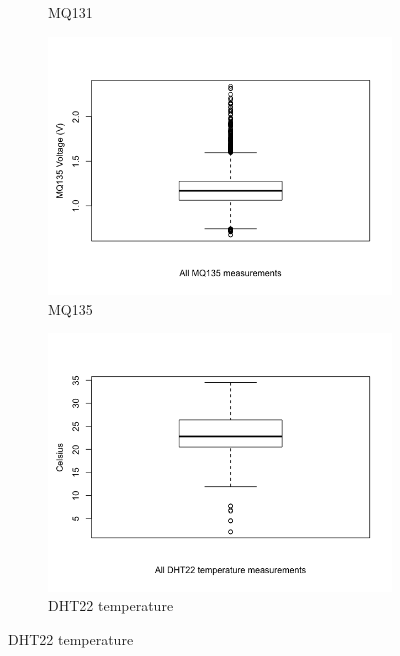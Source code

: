 \documentclass[11pt]{report}
\begin{document}
\begin{figure}[!tb]
\begin{minipage}{1\linewidth}
\begin{subfigure}[t]{.5\linewidth}
            	\caption{MQ131}
            	\label{fig:mq131_boxplot}
	   \end{subfigure}
        \end{minipage}
    \begin{minipage}{1\linewidth}
            \begin{subfigure}[t]{.5\linewidth}
                \includegraphics[width=\textwidth]{images/mq135_boxplot}
                \caption{MQ135}
                \label{fig:pm_boxplot}
            \end{subfigure}
            \begin{subfigure}[t]{.5\linewidth}
            	\includegraphics[width=\textwidth]{images/temp_boxplot}
            	\caption{DHT22 temperature}

\end{subfigure}
\end{minipage}
\end{figure}
\end{document}
